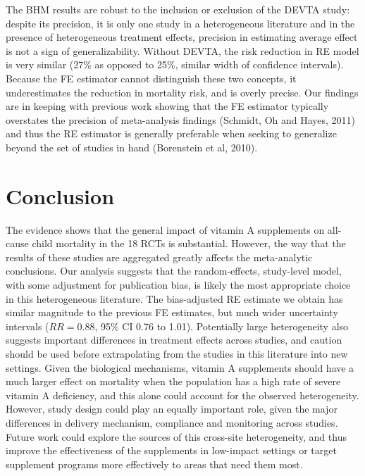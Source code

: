 \documentclass[12pt]{article}
\begin{document}
The BHM results are robust to the inclusion or exclusion of the DEVTA study: despite its precision, it is only one study in a heterogeneous literature and in the presence of heterogeneous treatment effects, precision in estimating average effect is not a sign of generalizability. Without DEVTA, the risk reduction in RE model is very similar (27\% as opposed to 25\%, similar width of confidence intervals). Because the FE estimator cannot distinguish these two concepts, it underestimates the reduction in mortality risk, and is overly precise. 
Our findings are in keeping with previous work showing that the FE estimator typically overstates the precision of meta-analysis findings (Schmidt, Oh and Hayes, 2011) and thus the RE estimator is generally preferable when seeking to generalize beyond the set of studies in hand (Borenstein et al, 2010). 



\section{Conclusion}

The evidence shows that the general impact of vitamin A supplements on all-cause child mortality in the 18 RCTs is substantial. 
However, the way that the results of these studies are aggregated greatly affects the meta-analytic conclusions. Our analysis suggests that the random-effects, study-level model, with some adjustment for publication bias, is likely the most appropriate choice in this heterogeneous literature. 
The bias-adjusted RE estimate we obtain has similar magnitude to the previous FE estimates, but much wider uncertainty intervals ($RR = 0.88$, 95\% CI 0.76 to 1.01). Potentially large heterogeneity also suggests important differences in treatment effects across studies, and caution should be used before extrapolating from the studies in this literature into new settings. Given the biological mechanisms, vitamin A supplements should have a much larger effect on mortality when the population has a high rate of severe vitamin A deficiency, and this alone could account for the observed heterogeneity. However, study design could play an equally important role, given the major differences in delivery mechanism, compliance and monitoring across studies. Future work could explore the sources of this cross-site heterogeneity, and thus improve the effectiveness of the supplements in low-impact settings or target supplement programs more effectively to areas that need them most.
\end{document}
